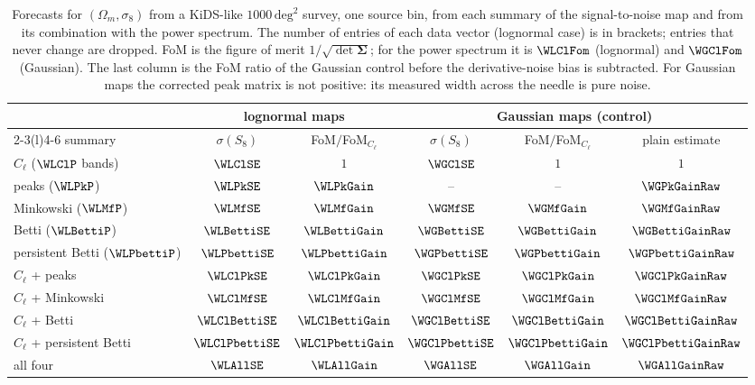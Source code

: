 \begin{table}[htbp]
\centering
\small
\begin{tabular}{@{}lccccc@{}}
\toprule
 & \multicolumn{2}{c}{lognormal maps} & \multicolumn{3}{c}{Gaussian maps (control)}\\
\cmidrule(lr){2-3}\cmidrule(l){4-6}
summary & $\sigma(S_8)$ & FoM$/$FoM$_{C_\ell}$ & $\sigma(S_8)$ & FoM$/$FoM$_{C_\ell}$ & plain estimate\\\midrule
$C_\ell$ ($\WLClP$ bands) & $\WLClSE$ & $1$ & $\WGClSE$ & $1$ & $1$\\
peaks ($\WLPkP$) & $\WLPkSE$ & $\WLPkGain$ & -- & -- & $\WGPkGainRaw$\\
Minkowski ($\WLMfP$) & $\WLMfSE$ & $\WLMfGain$ & $\WGMfSE$ & $\WGMfGain$ & $\WGMfGainRaw$\\
Betti ($\WLBettiP$) & $\WLBettiSE$ & $\WLBettiGain$ & $\WGBettiSE$ & $\WGBettiGain$ & $\WGBettiGainRaw$\\
persistent Betti ($\WLPbettiP$) & $\WLPbettiSE$ & $\WLPbettiGain$ & $\WGPbettiSE$ & $\WGPbettiGain$ & $\WGPbettiGainRaw$\\\midrule
$C_\ell$ + peaks & $\WLClPkSE$ & $\WLClPkGain$ & $\WGClPkSE$ & $\WGClPkGain$ & $\WGClPkGainRaw$\\
$C_\ell$ + Minkowski & $\WLClMfSE$ & $\WLClMfGain$ & $\WGClMfSE$ & $\WGClMfGain$ & $\WGClMfGainRaw$\\
$C_\ell$ + Betti & $\WLClBettiSE$ & $\WLClBettiGain$ & $\WGClBettiSE$ & $\WGClBettiGain$ & $\WGClBettiGainRaw$\\
$C_\ell$ + persistent Betti & $\WLClPbettiSE$ & $\WLClPbettiGain$ & $\WGClPbettiSE$ & $\WGClPbettiGain$ &
$\WGClPbettiGainRaw$\\
all four & $\WLAllSE$ & $\WLAllGain$ & $\WGAllSE$ & $\WGAllGain$ & $\WGAllGainRaw$\\
\bottomrule
\end{tabular}
\caption{Forecasts for $(\Omega_m,\sigma_8)$ from a KiDS-like $1000\,\mathrm{deg}^2$ survey, one source bin, from each
summary of the signal-to-noise map and from its combination with the power spectrum. The number of entries of each data
vector (lognormal case) is in brackets; entries that never change are dropped. FoM is the figure of merit $1/\sqrt{\det\bm\Sigma}$; for the power
spectrum it is $\WLClFom$ (lognormal) and $\WGClFom$ (Gaussian). The last column is the FoM ratio of the Gaussian
control before the derivative-noise bias is subtracted. For Gaussian maps the corrected peak matrix is not
positive: its measured width across the needle is pure noise.}
\label{12w:tab:beyond}
\end{table}

